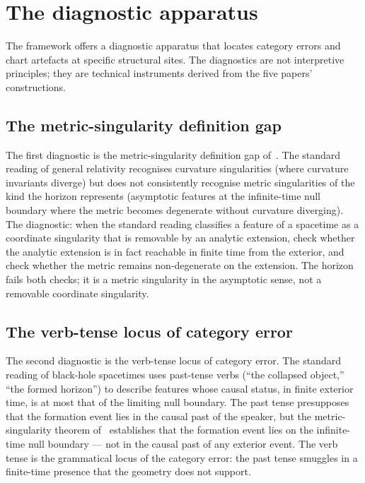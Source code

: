 \documentclass[11pt,a4paper]{article}
\theoremstyle{definition}
\begin{document}
\section{The diagnostic apparatus}\label{sec:diagnostics}

The framework offers a diagnostic apparatus that locates category errors and chart artefacts at specific structural sites. The diagnostics are not interpretive principles; they are technical instruments derived from the five papers' constructions.

\subsection{The metric-singularity definition gap}\label{sec:diagnostic-msg}

The first diagnostic is the metric-singularity definition gap of~\cite{JanzenBHcausality}. The standard reading of general relativity recognises curvature singularities (where curvature invariants diverge) but does not consistently recognise metric singularities of the kind the horizon represents (asymptotic features at the infinite-time null boundary where the metric becomes degenerate without curvature diverging). The diagnostic: when the standard reading classifies a feature of a spacetime as a coordinate singularity that is removable by an analytic extension, check whether the analytic extension is in fact reachable in finite time from the exterior, and check whether the metric remains non-degenerate on the extension. The horizon fails both checks; it is a metric singularity in the asymptotic sense, not a removable coordinate singularity.

\subsection{The verb-tense locus of category error}\label{sec:diagnostic-verb-tense}

The second diagnostic is the verb-tense locus of category error. The standard reading of black-hole spacetimes uses past-tense verbs (``the collapsed object,'' ``the formed horizon'') to describe features whose causal status, in finite exterior time, is at most that of the limiting null boundary. The past tense presupposes that the formation event lies in the causal past of the speaker, but the metric-singularity theorem of~\cite{JanzenBHcausality} establishes that the formation event lies on the infinite-time null boundary --- not in the causal past of any exterior event. The verb tense is the grammatical locus of the category error: the past tense smuggles in a finite-time presence that the geometry does not support.
\end{document}
